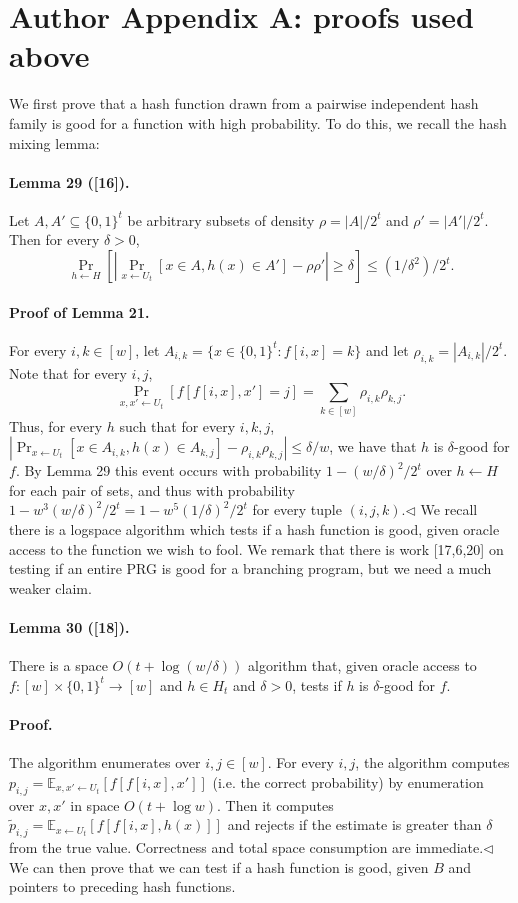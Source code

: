 \section*{Author Appendix A: proofs used above}
We first prove that a hash function drawn from a pairwise independent hash family is good for a function with high probability. To do this, we recall the hash mixing lemma:
\paragraph{Lemma 29 ([16]).} Let $A,A'\subseteq\{0,1\}^t$ be arbitrary subsets of density $\rho=|A|/2^t$ and $\rho'=|A'|/2^t$. Then for every $\delta>0$,
\[\Pr_{h\leftarrow H}\left[\left|\Pr_{x\leftarrow U_t}[x\in A,h(x)\in A']-\rho\rho'\right|\geq\delta\right]\leq(1/\delta^2)/2^t.\]
\paragraph{Proof of Lemma 21.} For every $i,k\in[w]$, let $A_{i,k}=\{x\in\{0,1\}^t:f[i,x]=k\}$ and let $\rho_{i,k}=|A_{i,k}|/2^t$. Note that for every $i,j$,
\[\Pr_{x,x'\leftarrow U_t}[f[f[i,x],x']=j]=\sum_{k\in[w]}\rho_{i,k}\rho_{k,j}.\]
Thus, for every $h$ such that for every $i,k,j$, $|\Pr_{x\leftarrow U_t}[x\in A_{i,k},h(x)\in A_{k,j}]-\rho_{i,k}\rho_{k,j}|\leq\delta/w$, we have that $h$ is $\delta$-good for $f$. By Lemma 29 this event occurs with probability $1-(w/\delta)^2/2^t$ over $h\leftarrow H$ for each pair of sets, and thus with probability $1-w^3(w/\delta)^2/2^t=1-w^5(1/\delta)^2/2^t$ for every tuple $(i,j,k)$.\hfill$\triangleleft$
We recall there is a logspace algorithm which tests if a hash function is good, given oracle access to the function we wish to fool. We remark that there is work [17,6,20] on testing if an entire PRG is good for a branching program, but we need a much weaker claim.
\paragraph{Lemma 30 ([18]).} There is a space $O(t+\log(w/\delta))$ algorithm that, given oracle access to $f:[w]\times\{0,1\}^t\to[w]$ and $h\in H_t$ and $\delta>0$, tests if $h$ is $\delta$-good for $f$.
\paragraph{Proof.} The algorithm enumerates over $i,j\in[w]$. For every $i,j$, the algorithm computes $p_{i,j}=\mathbb E_{x,x'\leftarrow U_t}[f[f[i,x],x']]$ (i.e. the correct probability) by enumeration over $x,x'$ in space $O(t+\log w)$. Then it computes $\widetilde p_{i,j}=\mathbb E_{x\leftarrow U_t}[f[f[i,x],h(x)]]$ and rejects if the estimate is greater than $\delta$ from the true value. Correctness and total space consumption are immediate.\hfill$\triangleleft$
We can then prove that we can test if a hash function is good, given $B$ and pointers to preceding hash functions.
